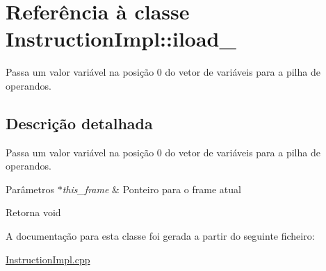 \hypertarget{class_instruction_impl_1_1iload__0}{}\section{Referência à classe Instruction\+Impl\+:\+:iload\+\_}
\label{class_instruction_impl_1_1iload__0}


Passa um valor variável na posição 0 do vetor de variáveis para a pilha de operandos.  




\subsection{Descrição detalhada}
Passa um valor variável na posição 0 do vetor de variáveis para a pilha de operandos. 


\begin{DoxyParams}{Parâmetros}
{\em $\ast$this\+\_\+frame} & Ponteiro para o frame atual \\
\hline
\end{DoxyParams}
\begin{DoxyReturn}{Retorna}
void 
\end{DoxyReturn}


A documentação para esta classe foi gerada a partir do seguinte ficheiro\+:\begin{DoxyCompactItemize}
\item 
\hyperlink{_instruction_impl_8cpp}{Instruction\+Impl.\+cpp}\end{DoxyCompactItemize}
